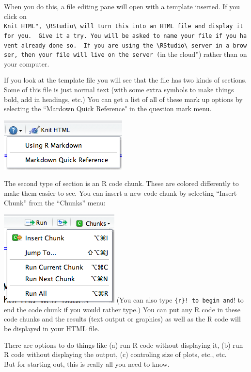 \documentclass[]{book}
\begin{document}
When you do this, a file editing pane will open with a template inserted. If you click on \texttt{Knit\ HTML",\ \textbackslash{}RStudio\textbackslash{}\ will\ turn\ this\ into\ an\ HTML\ file\ and\ display\ it\ for\ you.\ \ Give\ it\ a\ try.\ You\ will\ be\ asked\ to\ name\ your\ file\ if\ you\ haven\textquotesingle{}t\ already\ done\ so.\ \ If\ you\ are\ using\ the\ \textbackslash{}RStudio\textbackslash{}\ server\ in\ a\ browser,\ then\ your\ file\ will\ live\ on\ the\ server\ (}in the cloud'') rather than on your computer.

If you look at the template file you will see that the file has two kinds of sections. Some of this file is just normal text (with some extra symbols to make things bold, add in headings, etc.) You can get a list of all of these mark up options by selecting the ``Mardown Quick Reference" in the question mark menu.

\includegraphics{images/MardownQuickReference.png}

The second type of section is an R code chunk. These are colored differently to make them easier to see. You can insert a new code chunk by selecting ``Insert Chunk'' from the ``Chunks''
menu:

\includegraphics{images/InsertChunk.png}
(You can also type \texttt{\{r\}!\ to\ begin\ and}! to end the code chunk if you would rather type.) You can put any R code in these code chunks and the results (text output or graphics) as well as the R code will be displayed in your HTML file.

There are options to do things like (a) run R code without displaying it, (b) run R code without
displaying the output, (c) controling size of plots, etc., etc.\\
But for starting out, this is really all you need to know.
\end{document}
